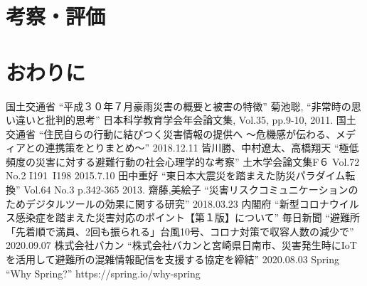 \documentclass[technicalreport,dvipdfmx]{ieicej}
\begin{document}
\section{考察・評価}

\section{おわりに}


%
%
\begin{thebibliography}{99}%
 国土交通省 “平成３０年７月豪雨災害の概要と被害の特徴”
 菊池聡, “非常時の思い違いと批判的思考” 日本科学教育学会年会論文集, Vol.35, pp.9-10, 2011.
 国土交通省 “住民自らの行動に結びつく災害情報の提供へ ～危機感が伝わる、メディアとの連携策をとりまとめ～” 2018.12.11
 皆川勝、中村遼太、高橋翔天 “極低頻度の災害に対する避難行動の社会心理学的な考察” 土木学会論文集F６ Vol.72 No.2 I191~I198 2015.7.10
 田中重好 “東日本大震災を踏まえた防災パラダイム転換” Vol.64 No.3 p.342-365 2013.
 齋藤,美絵子 “災害リスクコミュニケーションのためデジタルツールの効果に関する研究” 2018.03.23
 内閣府 “新型コロナウイルス感染症を踏まえた災害対応のポイント【第１版】について”
 毎日新聞 “避難所「先着順で満員、2回も振られる」台風10号、コロナ対策で収容人数の減少で” 2020.09.07
 株式会社バカン “株式会社バカンと宮崎県日南市、災害発生時にIoTを活用して避難所の混雑情報配信を支援する協定を締結” 2020.08.03
 Spring “Why Spring?” https://spring.io/why-spring
\end{thebibliography}
\end{document}
